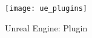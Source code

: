 
    \begin{figure}[h]
        \caption{Unreal Engine: Plugin}
        \centering
        \texttt{[image: ue\_plugins]}
        \label{fig:unreal_editor_plugins}
    \end{figure}
